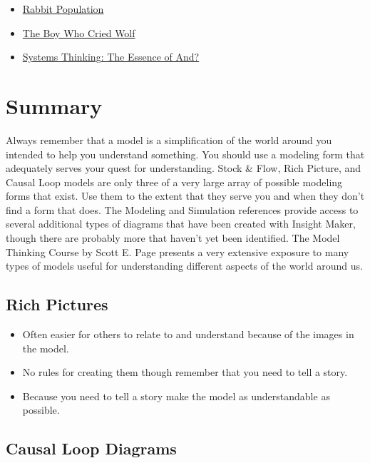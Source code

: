 \documentclass[]{memoir}
\begin{document}
\begin{itemize}
\itemsep1pt\parskip0pt
\item
  \href{http://insightmaker.com/insight/7104}{Rabbit Population}
\item
  \href{http://insightmaker.com/insight/7103}{The Boy Who Cried Wolf}
\item
  \href{http://insightmaker.com/insight/3365}{Systems Thinking: The
  Essence of And?}
\end{itemize}

\section{Summary}

Always remember that a model is a simplification of the world around you
intended to help you understand something. You should use a modeling
form that adequately serves your quest for understanding. Stock \& Flow,
Rich Picture, and Causal Loop models are only three of a very large
array of possible modeling forms that exist. Use them to the extent that
they serve you and when they don't find a form that does. The Modeling
and Simulation references provide access to several additional types of
diagrams that have been created with Insight Maker, though there are
probably more that haven't yet been identified. The Model Thinking
Course by Scott E. Page presents a very extensive exposure to many types
of models useful for understanding different aspects of the world around
us.

\subsection{Rich Pictures}

\begin{itemize}
\itemsep1pt\parskip0pt
\item
  Often easier for others to relate to and understand because of the
  images in the model.
\item
  No rules for creating them though remember that you need to tell a
  story.
\item
  Because you need to tell a story make the model as understandable as
  possible.
\end{itemize}

\subsection{Causal Loop Diagrams}
\end{document}
